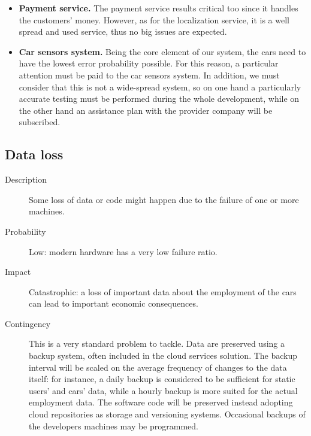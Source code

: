 \begin{description}
\begin{itemize}
				\item \textbf{Payment service.} The payment service results critical too since it handles the customers' money. However, as for the localization service, it is a well spread and used service, thus no big issues are expected.
				\item \textbf{Car sensors system.} Being the core element of our system, the cars need to have the lowest error probability possible. For this reason, a particular attention must be paid to the car sensors system. In addition, we must consider that this is not a wide-spread system, so on one hand a particularly accurate testing must be performed during the whole development, while on the other hand an assistance plan with the provider company will be subscribed.
			\end{itemize}
	\end{description}

\subsection*{Data loss}
	\begin{description}
		\item[Description] Some loss of data or code might happen due to the failure of one or more machines.
		\item[Probability] Low: modern hardware has a very low failure ratio.
		\item[Impact] Catastrophic: a loss of important data about the employment of the cars can lead to important economic consequences.
		\item[Contingency] This is a very standard problem to tackle. Data are preserved using a backup system, often included in the cloud services solution. The backup interval will be scaled on the average frequency of changes to the data itself: for instance, a daily backup is considered to be sufficient for static users' and cars' data, while a hourly backup is more suited for the actual employment data.\newline
		The software code will be preserved instead adopting cloud repositories as storage and versioning systems. Occasional backups of the developers machines may be programmed.
	\end{description}

